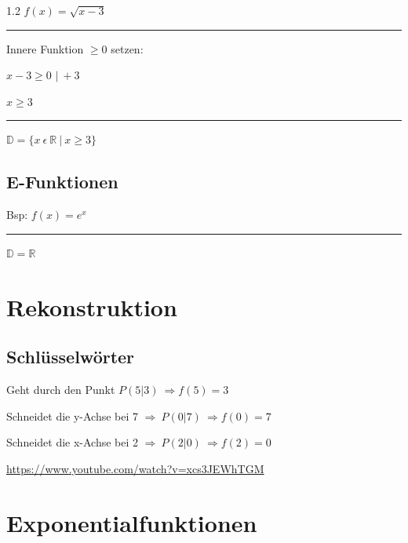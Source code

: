 \documentclass{article}
\newcommand{\Zeilenabstand}{1.2}
\newcommand{\absatz}{5mm}
\newcommand{\strich}{\vspace{\absatz}\hrule\vspace{\absatz}}
\begin{document}
\begin{spacing}{\Zeilenabstand}
    $f(x)=\sqrt{x-3}$

    \strich

    Innere Funktion $\geq 0$ setzen:

    $x-3 \geq 0$ $\vert \ + 3$

    $x\geq3$

    \strich

    $\mathbb{D} = \{ x \ \epsilon \ \mathbb{R} \ \vert \ x \geq3\}$

    \subsection{E-Funktionen}
    Bsp:
    $f(x)=e^x$

    \strich

    $\mathbb{D} = \mathbb{R}$ 



    \newpage

    \section{Rekonstruktion}

    \subsection{Schlüsselwörter}

    Geht durch den Punkt $P(5\vert 3) \ \Rightarrow f(5)=3 $

    Schneidet die y-Achse bei 7 $\Rightarrow \ P(0\vert 7) \ \Rightarrow f(0)=7 $

    Schneidet die x-Achse bei 2 $\Rightarrow \ P(2\vert 0) \ \Rightarrow f(2)=0 $

    \url{https://www.youtube.com/watch?v=xcs3JEWhTGM}


    \newpage

    \section{Exponentialfunktionen}



\end{spacing}
\end{document}
